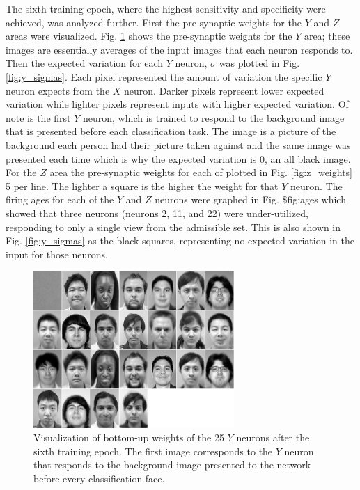 \documentclass[conference]{IEEEtran}
\begin{document}
The sixth training epoch, where the highest sensitivity and specificity were achieved, was analyzed further.  First the pre-synaptic weights for the $Y$ and $Z$ areas were visualized.  Fig. \ref{fig:y_weights} shows the pre-synaptic weights for the $Y$ area; these images are essentially averages of the input images that each neuron responds to.  Then the expected variation for each $Y$ neuron, $\sigma$ was plotted in Fig. \ref{fig:y_sigmas}.  Each pixel represented the amount of variation the specific $Y$ neuron expects from the $X$ neuron.  Darker pixels represent lower expected variation while lighter pixels represent inputs with higher expected variation.  Of note is the first $Y$ neuron, which is trained to respond to the background image that is presented before each classification task.  The image is a picture of the background each person had their picture taken against and the same image was presented each time which is why the expected variation is 0, an all black image.  For the $Z$ area the pre-synaptic weights for each of plotted in Fig. \ref{fig:z_weights} 5 per line. The lighter a square is the higher the weight for that $Y$ neuron.  The firing ages for each of the $Y$ and $Z$ neurons were graphed in Fig. \${fig:ages} which showed that three neurons (neurons 2, 11, and 22) were under-utilized, responding to only a single view from the admissible set.  This is also shown in Fig. \ref{fig:y_sigmas} as the black squares, representing no expected variation in the input for those neurons.

\begin{figure}
\center
\includegraphics[width=3in]{figs/epoch_5_0_xy.eps}
\caption{Visualization of bottom-up weights of the 25 $Y$ neurons after the sixth training epoch.  The first image corresponds to the $Y$ neuron that responds to the background image presented to the network before every classification face.}
\label{fig:y_weights}
\end{figure}
\end{document}
